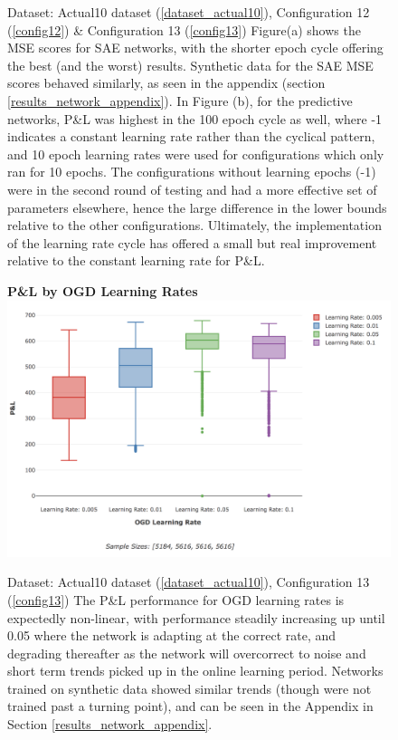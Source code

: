 \documentclass[a4paper,11pt,oneside]{article}
\theoremstyle{plain}
\theoremstyle{definition}
\begin{document}
\begin{figure}[H]
\begin{subfigure}{.5\textwidth}
{				\newline }
			\label{figure-actual_pl_lr_epochs}
		\end{subfigure}
		\caption[Effects of Epoch Cycle Lengths (Actual Data)]{Dataset: Actual10 dataset (\ref{dataset_actual10}), Configuration 12 (\ref{config12}) \& Configuration 13 (\ref{config13})
			\newline Figure(a) shows the MSE scores for SAE networks, with the shorter epoch cycle offering the best (and the worst) results. Synthetic data for the SAE MSE scores behaved similarly, as seen in the appendix (section \ref{results_network_appendix}). 
			\newline In Figure (b), for the predictive networks, P\&L was highest in the 100 epoch cycle as well, where -1 indicates a constant learning rate rather than the cyclical pattern, and 10 epoch learning rates were used for configurations which only ran for 10 epochs. The configurations without learning epochs (-1) were in the second round of testing and had a more effective set of parameters elsewhere, hence the large difference in the lower bounds relative to the other configurations. Ultimately, the implementation of the learning rate cycle has offered a small but real improvement relative to the constant learning rate for P\&L.}
		\label{figure-epochs_lr}
	\end{figure}
	
	
	\begin{figure}[H]
		\textbf{P\&L by OGD Learning Rates}
		\centering
		\includegraphics[scale=0.45]{images/results/network/lr/actual_ogd_lr.png}
		\caption[P\&L by OGD Learning Rates]{Dataset: Actual10 dataset (\ref{dataset_actual10}), Configuration 13 (\ref{config13})
			\newline The P\&L performance for OGD learning rates is expectedly non-linear, with performance steadily increasing up until 0.05 where the network is adapting at the correct rate, and degrading thereafter as the network will overcorrect to noise and short term trends picked up in the online learning period. Networks trained on synthetic data showed similar trends (though were not trained past a turning point), and can be seen in the Appendix in Section \ref{results_network_appendix}.}
		\label{figure-actual_ogd_lr}
	\end{figure}
	
\end{document}
